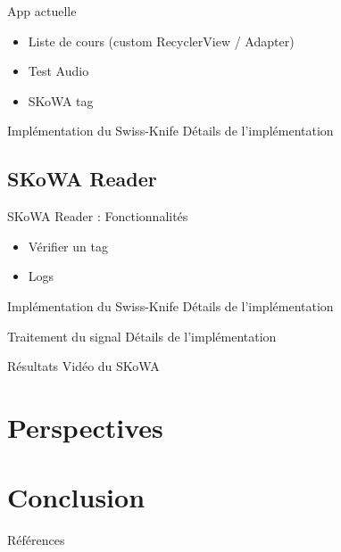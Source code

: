 \documentclass[aspectratio=169]{beamer}
\begin{document}
\begin{frame}{App actuelle}

    \begin{itemize}
        \item Liste de cours (custom RecyclerView / Adapter)
        \item Test Audio
        \item SKoWA tag
    \end{itemize}

\end{frame}

\begin{frame}{Implémentation du Swiss-Knife}
    Détails de l'implémentation
\end{frame}

\subsection{SKoWA Reader}

\begin{frame}{SKoWA Reader : Fonctionnalités}

    \begin{itemize}
        \item Vérifier un tag
        \item Logs
    \end{itemize}

\end{frame}

\begin{frame}{Implémentation du Swiss-Knife}
    Détails de l'implémentation
\end{frame}

\begin{frame}{Traitement du signal}
    Détails de l'implémentation
\end{frame}

\begin{frame}{Résultats}
    Vidéo du SKoWA
\end{frame}

\section{Perspectives}

\section{Conclusion}


\begin{frame}{Références}
    \printbibliography
\end{frame}
\end{document}
